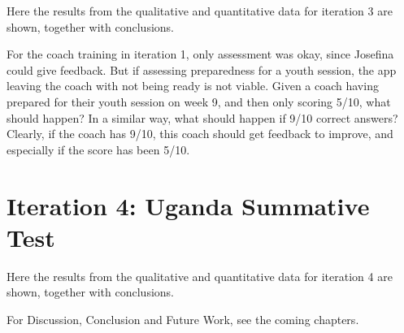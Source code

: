 Here the results from the qualitative and quantitative data for iteration 3 are shown, together with conclusions.

For the coach training in iteration 1, only assessment was okay, since Josefina could give feedback. But if assessing preparedness for a youth session, the app leaving the coach with not being ready is not viable. Given a coach having prepared for their youth session on week 9, and then only scoring 5/10, what should happen? In a similar way, what should happen if 9/10 correct answers? Clearly, if the coach has 9/10, this coach should get feedback to improve, and especially if the score has been 5/10.





\section{Iteration 4: Uganda Summative Test}

Here the results from the qualitative and quantitative data for iteration 4 are shown, together with conclusions.



%

For Discussion, Conclusion and Future Work, see the coming chapters.

%
%
%  
%  
%  
%  
%
%
%
%  
%  
%  
%  
%
%
%  
%  
%  
%  


%

